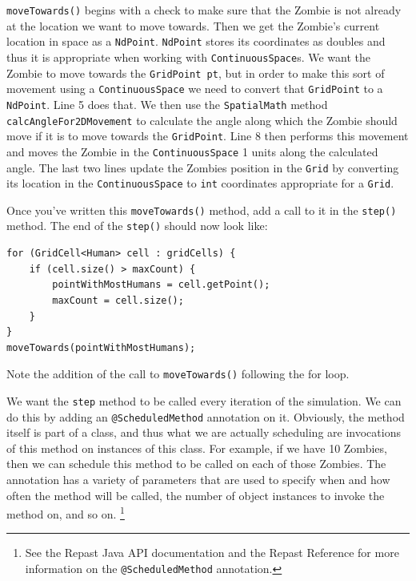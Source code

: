 \documentclass[11pt]{amsart}
\begin{document}
\texttt{moveTowards()} begins with a check to make sure that the Zombie is not already at the location we want to move towards. Then we get the Zombie's current location in space as a \texttt{NdPoint}. \texttt{NdPoint} stores its coordinates as doubles and thus it is appropriate when working with \texttt{ContinuousSpace}s. We want the Zombie to move towards the \texttt{GridPoint pt}, but in order to make this sort of movement using a \texttt{ContinuousSpace} we need to convert that \texttt{GridPoint} to a \texttt{NdPoint}. Line 5 does that. We then use the \texttt{SpatialMath} method \texttt{calcAngleFor2DMovement} to calculate the angle along which the Zombie should move if it is to move towards the \texttt{GridPoint}. Line 8 then performs this movement and moves the Zombie in the \texttt{ContinuousSpace} 1 units along the calculated angle. The last two lines update the Zombies position in the \texttt{Grid} by converting its location in the \texttt{ContinuousSpace} to \texttt{int} coordinates appropriate for a \texttt{Grid}.

Once you've written this \texttt{moveTowards()} method, add a call to it in the \texttt{step()} method. The end of the \texttt{step()} should now look like:

\noindent\begin{minipage}[h]{\textwidth}
\vspace{.2in}
\lstset{language=java,caption=Step with MoveTowards Added}
\begin{lstlisting}
for (GridCell<Human> cell : gridCells) {
	if (cell.size() > maxCount) {
		pointWithMostHumans = cell.getPoint();
		maxCount = cell.size();
	}
}
moveTowards(pointWithMostHumans);
\end{lstlisting}
\vspace{.2in}
\end{minipage}
Note the addition of the call to \texttt{moveTowards()} following the for loop.

We want the \texttt{step} method to be called every iteration of the simulation. We can do this by adding an \texttt{@ScheduledMethod} annotation on it. Obviously, the method itself is part of a class, and thus what we are actually scheduling are invocations of this method on instances of this class. For example, if we have 10 Zombies, then we can schedule this method to be called on each of those Zombies. The annotation has a variety of parameters that are used to specify when and how often the method will be called, the number of object instances to invoke the method on, and so on. \footnote{See the Repast Java API documentation and the Repast Reference for more information on the \texttt{@ScheduledMethod} annotation.} 
\end{document}

